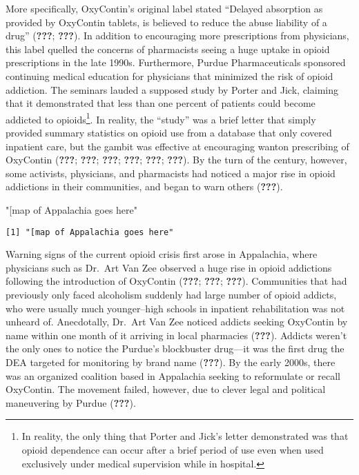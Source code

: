 \documentclass[12pt,twoside]{reedthesis}
\newenvironment{Shaded}{\begin{snugshade}}{\end{snugshade}}
\newcommand{\StringTok}[1]{\textcolor[rgb]{0.31,0.60,0.02}{#1}}
\begin{document}
More specifically, OxyContin's original label stated ``Delayed absorption as provided by OxyContin tablets, is believed to reduce the abuse liability of a drug'' ({\textbf{???}}; {\textbf{???}}). In addition to encouraging more prescriptions from physicians, this label quelled the concerns of pharmacists seeing a huge uptake in opioid prescriptions in the late 1990s. Furthermore, Purdue Pharmaceuticals sponsored continuing medical education for physicians that minimized the risk of opioid addiction. The seminars lauded a supposed study by Porter and Jick, claiming that it demonstrated that less than one percent of patients could become addicted to opioids\footnote{In reality, the only thing that Porter and Jick's letter demonstrated was that opioid dependence can occur after a brief period of use even when used exclusively under medical supervision while in hospital.}. In reality, the ``study'' was a brief letter that simply provided summary statistics on opioid use from a database that only covered inpatient care, but the gambit was effective at encouraging wanton prescribing of OxyContin ({\textbf{???}}; {\textbf{???}}; {\textbf{???}}; {\textbf{???}}; {\textbf{???}}; {\textbf{???}}). By the turn of the century, however, some activists, physicians, and pharmacists had noticed a major rise in opioid addictions in their communities, and began to warn others ({\textbf{???}}).
\begin{Shaded}
\begin{Highlighting}[]
\StringTok{"[map of Appalachia goes here"}
\end{Highlighting}
\end{Shaded}
\begin{verbatim}
[1] "[map of Appalachia goes here"
\end{verbatim}
Warning signs of the current opioid crisis first arose in Appalachia, where physicians such as Dr.~Art Van Zee observed a huge rise in opioid addictions following the introduction of OxyContin ({\textbf{???}}; {\textbf{???}}; {\textbf{???}}). Communities that had previously only faced alcoholism suddenly had large number of opioid addicts, who were usually much younger--high schools in inpatient rehabilitation was not unheard of. Anecdotally, Dr.~Art Van Zee noticed addicts seeking OxyContin by name within one month of it arriving in local pharmacies ({\textbf{???}}). Addicts weren't the only ones to notice the Purdue's blockbuster drug---it was the first drug the DEA targeted for monitoring by brand name ({\textbf{???}}). By the early 2000s, there was an organized coalition based in Appalachia seeking to reformulate or recall OxyContin. The movement failed, however, due to clever legal and political maneuvering by Purdue ({\textbf{???}}).
\end{document}
